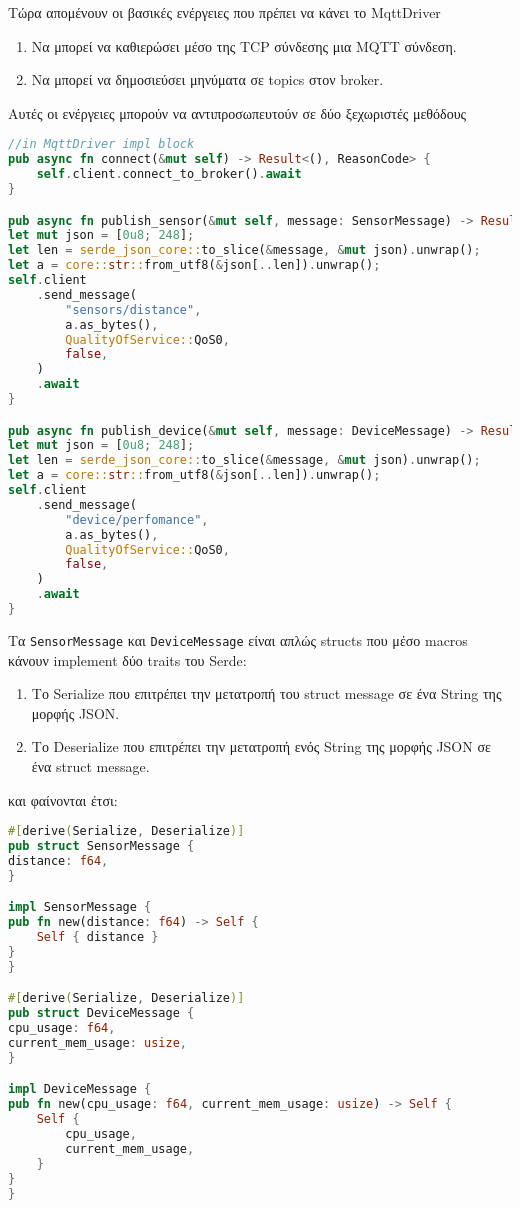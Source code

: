 Τώρα απομένουν οι βασικές ενέργειες που πρέπει να κάνει το MqttDriver

\begin{enumerate}
\item Να μπορεί να καθιερώσει μέσο της TCP σύνδεσης μια MQTT σύνδεση.
\item Να μπορεί να δημοσιεύσει μηνύματα σε topics στον broker.
\end{enumerate}

Αυτές οι ενέργειες μπορούν να αντιπροσωπευτούν σε δύο ξεχωριστές μεθόδους

\begin{lstlisting}[language=Rust]
//in MqttDriver impl block
pub async fn connect(&mut self) -> Result<(), ReasonCode> {
    self.client.connect_to_broker().await
}

pub async fn publish_sensor(&mut self, message: SensorMessage) -> Result<(), ReasonCode> {
let mut json = [0u8; 248];
let len = serde_json_core::to_slice(&message, &mut json).unwrap();
let a = core::str::from_utf8(&json[..len]).unwrap();
self.client
    .send_message(
        "sensors/distance",
        a.as_bytes(),
        QualityOfService::QoS0,
        false,
    )
    .await
}

pub async fn publish_device(&mut self, message: DeviceMessage) -> Result<(), ReasonCode> {
let mut json = [0u8; 248];
let len = serde_json_core::to_slice(&message, &mut json).unwrap();
let a = core::str::from_utf8(&json[..len]).unwrap();
self.client
    .send_message(
        "device/perfomance",
        a.as_bytes(),
        QualityOfService::QoS0,
        false,
    )
    .await
}
\end{lstlisting}

Τα \verb|SensorMessage| και \verb|DeviceMessage| είναι απλώς structs που μέσο macros κάνουν implement
δύο traits του Serde:

\begin{enumerate}
\item Το Serialize που επιτρέπει την μετατροπή του struct message σε ένα
  String της μορφής JSON.
\item Το Deserialize που επιτρέπει την μετατροπή ενός String της
  μορφής JSON σε ένα struct message.
\end{enumerate}

και φαίνονται έτσι:

\begin{lstlisting}[language=Rust]
#[derive(Serialize, Deserialize)]
pub struct SensorMessage {
distance: f64,
}

impl SensorMessage {
pub fn new(distance: f64) -> Self {
    Self { distance }
}
}

#[derive(Serialize, Deserialize)]
pub struct DeviceMessage {
cpu_usage: f64,
current_mem_usage: usize,
}

impl DeviceMessage {
pub fn new(cpu_usage: f64, current_mem_usage: usize) -> Self {
    Self {
        cpu_usage,
        current_mem_usage,
    }
}
}
\end{lstlisting}

